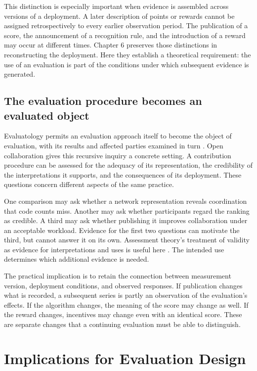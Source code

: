 This distinction is especially important when evidence is assembled across versions of a deployment. A later description of points or rewards cannot be assigned retrospectively to every earlier observation period. The publication of a score, the announcement of a recognition rule, and the introduction of a reward may occur at different times. Chapter 6 preserves those distinctions in reconstructing the deployment. Here they establish a theoretical requirement: the use of an evaluation is part of the conditions under which subsequent evidence is generated.

\subsection{The evaluation procedure becomes an evaluated object}
Evaluatology permits an evaluation approach itself to become the object of evaluation, with its results and affected parties examined in turn \citep[Section 8.7.4]{zhan2026book}. Open collaboration gives this recursive inquiry a concrete setting. A contribution procedure can be assessed for the adequacy of its representation, the credibility of the interpretations it supports, and the consequences of its deployment. These questions concern different aspects of the same practice.

One comparison may ask whether a network representation reveals coordination that code counts miss. Another may ask whether participants regard the ranking as credible. A third may ask whether publishing it improves collaboration under an acceptable workload. Evidence for the first two questions can motivate the third, but cannot answer it on its own. Assessment theory's treatment of validity as evidence for interpretations and uses is useful here \citep{messick1995}. The intended use determines which additional evidence is needed.

The practical implication is to retain the connection between measurement version, deployment conditions, and observed responses. If publication changes what is recorded, a subsequent series is partly an observation of the evaluation's effects. If the algorithm changes, the meaning of the score may change as well. If the reward changes, incentives may change even with an identical score. These are separate changes that a continuing evaluation must be able to distinguish.

\section{Implications for Evaluation Design}
\label{sec:value-theory}

